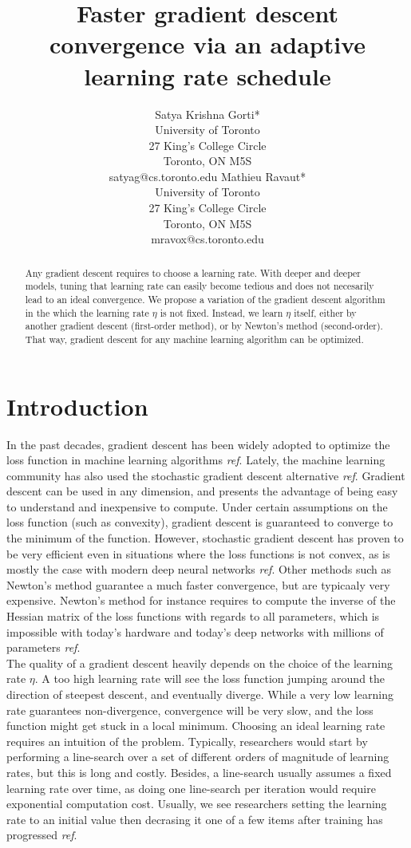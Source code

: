 \documentclass{article}
\title{Faster gradient descent convergence via an adaptive learning rate schedule}
\author{
  	Satya Krishna Gorti*\\
  	University of Toronto\\
  	27 King's College Circle\\
  	Toronto, ON M5S\\
  	satyag@cs.toronto.edu
  	\And
	Mathieu Ravaut* \\ 
	University of Toronto \\
	27 King's College Circle\\
	Toronto, ON M5S\\
	mravox@cs.toronto.edu \\
}
\begin{document}
  
  \maketitle
  
  \begin{abstract}
    Any gradient descent requires to choose a learning rate. With deeper and deeper models, tuning that learning rate can easily become tedious and does not necesarily lead to an ideal convergence. We propose a variation of the gradient descent algorithm in the which the learning rate $\eta$ is not fixed. Instead, we learn $\eta$ itself, either by another gradient descent (first-order method), or by Newton's method (second-order). That way, gradient descent for any machine learning algorithm can be optimized. 
  \end{abstract}
  
  \thispagestyle{equalc}
  \section{Introduction}
  
  In the past decades, gradient descent has been widely adopted to optimize the loss function in machine learning algorithms \emph{ref}. Lately, the machine learning community has also used the stochastic gradient descent alternative \emph{ref}. Gradient descent can be used in any dimension, and presents the advantage of being easy to understand and inexpensive to compute. Under certain assumptions on the loss function (such as convexity), gradient descent is guaranteed to converge to the minimum of the function. However, stochastic gradient descent has proven to be very efficient even in situations where the loss functions is not convex, as is mostly the case with modern deep neural networks \emph{ref}. Other methods such as Newton's method guarantee a much faster convergence, but are typicaaly very expensive. Newton's method for instance requires to compute the inverse of the Hessian matrix of the loss functions with regards to all parameters, which is impossible with today's hardware and today's deep networks with millions of parameters \emph{ref}. \\
  
  The quality of a gradient descent heavily depends on the choice of the learning rate $\eta$. A too high learning rate will see the loss function jumping around the direction of steepest descent, and eventually diverge. While a very low learning rate guarantees non-divergence, convergence will be very slow, and the loss function might get stuck in a local minimum. Choosing an ideal learning rate requires an intuition of the problem. Typically, researchers would start by performing a line-search over a set of different orders of magnitude of learning rates, but this is long and costly. Besides, a line-search usually assumes a fixed learning rate over time, as doing one line-search per iteration would require exponential computation cost. Usually, we see researchers setting the learning rate to an initial value then decrasing it one of a few items after training has progressed \emph{ref}.\\
  
\end{document}
